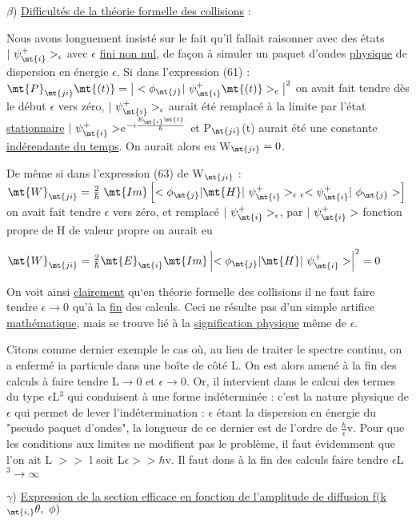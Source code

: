 $\beta$) \ul{Difficultés de la théorie formelle des collisions} :

Nous avons longuement insisté sur le fait qu'il fallait raisonner
avec des états $|\ \psi_\mt{i}^+>_\epsilon$ avec $\epsilon$ \ul{fini non nul}, de façon à simuler un paquet
d'ondes \ul{physique} de dispersion en énergie $\epsilon$. Si dans l'expression (61) :
$\mt{P}_\mt{ji}\mt{(t)}=\big|<\phi_\mt{j }|\ \psi_\mt{i}^+\mt{(t)}>_\epsilon\big|^2$
on avait fait tendre dès le début $\epsilon$ vers zéro, $|\ \psi_\mt{i}^+>_\epsilon$ aurait été remplacé
à la limite par l'état \ul{stationnaire} $|\ \psi_\mt{i}^+>$e$^{-i\frac{E_\mt{i}\mt{t}}{\hbar}}$ et
P$_\mt{ji}$(t) aurait été une constante \ul{indérendante du temps}. On aurait alors eu W$_\mt{ji}=0$.

De même si dans l'expression (63) de W$_\mt{ji}$ :
$\mt{W}_\mt{ji}=\frac{2}{\hbar}\;\mt{Im}
\left[<\phi_\mt{j }|\mt{ H }|\ \psi_\mt{i}^+>_{\epsilon\ \epsilon}<\psi_\mt{i}^+|\ \phi_\mt{j}>\right]$
on avait fait tendre $\epsilon$ vers zéro, et remplacé $|\ \psi_\mt{i}^+>_\epsilon$,
par $|\ \psi_\mt{i}^+>$ fonction propre de H de valeur propre on aurait eu
\begin{center}
$\mt{W}_\mt{ji}=\frac{2}{\hbar}\mt{ E}_\mt{i }\mt{ Im}
\left|<\phi_\mt{j }|\mt{ H }|\ \psi_\mt{i}^+>\right|^2=0$
\end{center}

On voit ainsi \ul{clairement} qu‘en théorie formelle des collisions
il ne faut faire tendre $\epsilon\to0$ qu'à la \ul{fin} des calculs. Ceci ne résulte
pas d'un simple artifice \ul{mathématique}, mais se trouve lié à la \ul{signification
physique} même de $\epsilon$.

Citons comme dernier exemple le cas où, au lieu de traiter le
spectre continu, on a enfermé ia particule dans une boîte de côté L. On
est alors amené à la fin des calculs à faire tendre L$\to0$ et $\epsilon\to0$. Or, il
intervient dans le calcui des termes du type $\epsilon$L$^3$ qui conduisent à une forme
indéterminée : c'est la nature physique de $\epsilon$ qui permet de lever l'indétermination : 
$\epsilon$ étant la dispersion en énergie du "pseudo paquet d'ondes", la
longueur de ce dernier est de l'ordre de $\frac{\hbar}{\epsilon}$v. Pour que les conditions aux
limites ne modifient pas le problème, il faut évidemment que l'on ait L $>>$ l
soit L$\epsilon >> \hbar$v. Il faut dons à la fin des calculs faire tendre $\epsilon$L$^3\to\infty$

$\gamma$) \ul{Expression de la section efficace en fonction de l'amplitude de diffusion f(k$_\mt{i, }\theta,\ \phi)$}

